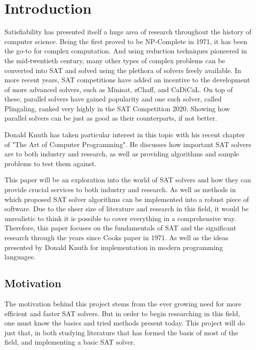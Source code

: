 \documentclass{article}
\begin{document}
\section{Introduction}
Satisfiability has presented itself a huge area of research throughout the history of computer
science. Being the first proved to be NP-Complete in 1971\cite{scook}, it has been the go-to for complex
computation. And using reduction techniques pioneered in the mid-twentieth century, many other types
of complex problems can be converted into SAT and solved using the plethora of solvers freely
available. In more recent years, SAT competitions have added an incentive to the development of more
advanced solvers, such as Minisat, zChaff, and CaDiCaL. On top of these, parallel solvers have
gained popularity and one such solver, called Plingaling, ranked very highly in the SAT Competition
2020. Showing how parallel solvers can be just as good as their counterparts, if not better.

Donald Knuth has taken particular interest in this topic with his recent chapter of "The Art of Computer Programming". He
discusses how important SAT solvers are to both industry and research, as well as providing algorithms and sample problems to
test them against.

This paper will be an exploration into the world of SAT solvers and how they can provide crucial services to both industry and
research. As well as methods in which proposed SAT solver algorithms can be implemented into a robust piece of software. Due to
the sheer size of literature and research in this field, it would be unrealistic to think it is possible to cover everything in a
comprehensive way. Therefore, this paper focuses on the fundamentals of SAT and the significant research through the years since
Cooks paper in 1971\cite{scook}. As well as the ideas presented by Donald Knuth for implementation in modern programming
languages.

\subsection{Motivation}
The motivation behind this project stems from the ever growing need for more efficient and faster SAT solvers. But in order to
begin researching in this field, one must know the basics and tried methods present today. This project will do just that, in
both studying literature that has formed the basis of most of the field, and implementing a basic SAT solver.
\end{document}
